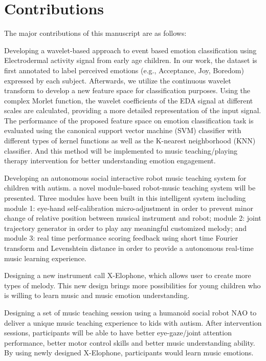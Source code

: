 \section{Contributions}
The major contributions of this manuscript are as follows:
\bi
\item 
Developing a wavelet-based approach to event based emotion classification
using Electrodermal activity signal from early age children. In our work, 
the dataset is first annotated to label perceived emotions (e.g., Acceptance, 
Joy, Boredom) expressed by each subject. Afterwards, we utilize the continuous 
wavelet transform to develop a new feature space for classification purposes. 
Using the complex Morlet function, the wavelet coefficients of the EDA signal 
at different scales are calculated, providing a more detailed representation of 
the input signal. The performance of the proposed feature space on emotion 
classification task is evaluated using the canonical support vector machine 
(SVM) classifier with different types of kernel functions as well as the 
K-nearest neighborhood (KNN) classifier. And this method will be
implemented to music teaching/playing therapy intervention for better
understanding emotion engagement.\\

\item 
Developing an autonomous social interactive robot music teaching system
for children with autism. a novel module-based robot-music teaching system will be presented. 
Three modules have been built in this intelligent system including module 1: eye-hand 
self-calibration micro-adjustment in order to prevent minor change of relative position
between musical instrument and robot; module 2: joint trajectory generator in order to 
play any meaningful customized melody; and module 3: real time performance scoring 
feedback using short time Fourier transform and Levenshtein distance in order to provide
a autonomous real-time music learning experience.\\

\item 
Designing a new instrument call X-Elophone, which allows user to create
more types of melody. This new design brings more possibilities for young
children who is willing to learn music and music emotion understanding.\\


\item 
Designing a set of music teaching session using a humanoid social robot
NAO to deliver a unique music teaching experience to kids with autism.
After intervention sessions, participants will be able to have better
eye-gaze/joint attention performance, better motor control skills and 
better music understanding ability. By using newly designed X-Elophone, 
participants would learn music
emotions.\\

